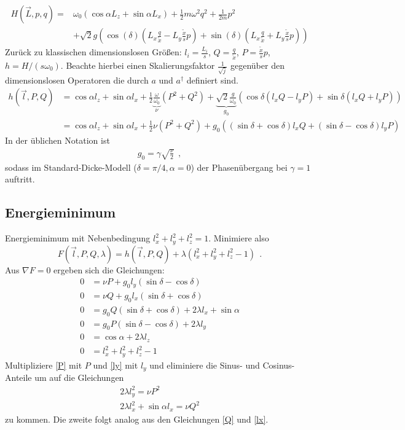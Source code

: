 \begin{align*}
 H(\vec{L},p,q) =& \omega_0 (\cos \alpha L_z + \sin\alpha L_x)+ \frac{1}{2} m \omega^2 q^2 + \frac{1}{2m}p^2 \\
&+ \sqrt{2}g\left( \cos(\delta) ( L_x \frac{q}{\tilde{x}} - L_y \frac{\tilde{x}}{s} p) 
+ \sin(\delta)( L_x \frac{q}{\tilde{x}} + L_y \frac{\tilde{x}}{s} p)\right)
\end{align*}
Zurück zu klassischen dimensionslosen Größen: $l_i = \frac{L_i}{s}$, $Q=\frac{q}{\tilde{x}}$, $P = \frac{\tilde{x}}{s}p$, $h = H/(s\omega_0)$. Beachte hierbei einen Skalierungsfaktor $\frac{1}{\sqrt{j}}$ gegenüber den dimensionslosen Operatoren die durch $a$ und $a^\dagger$ definiert sind.
\begin{align}
 h(\vec{l},P,Q) &= \cos\alpha l_z + \sin \alpha l_x+ \frac{1}{2} \underbrace{\frac{\omega}{\omega_0}}_{\nu} (P^2 + Q^2) 
  + \underbrace{\sqrt{2} \frac{g}{\omega_0}}_{g_0} \left( \cos\delta (l_x Q - l_y P) + \sin\delta (l_x Q+l_y P)\right) \nonumber\\ 
  &= \cos\alpha l_z + \sin \alpha l_x + \frac12 \nu (P^2+Q^2) + g_0\left((\sin\delta + \cos\delta)l_x Q + (\sin\delta -\cos\delta)l_y P \right) \label{Hamiltonian}
\end{align}
In der üblichen Notation ist
\begin{align}
  g_0 = \gamma\sqrt{\frac{\nu}{2}}~~,
\end{align}
sodass im Standard-Dicke-Modell ($\delta = \pi/4,\alpha = 0$) der Phasenübergang bei $\gamma = 1$ auftritt.  
\subsection{Energieminimum}
Energieminimum mit Nebenbedingung $l_x^2 + l_y^2+l_z^2 = 1$. Minimiere also 
\begin{equation*}
F(\vec{l}, P,Q, \lambda) = h(\vec{l}, P,Q)+\lambda (l_x^2 + l_y^2+l_z^2 - 1) ~~.
\end{equation*}
Aus $\nabla F = 0$ ergeben sich die Gleichungen:
\begin{align}
  0 &= \nu P + g_0 l_y (\sin \delta - \cos \delta)\label{P}\\
  0 &= \nu Q + g_0 l_x (\sin \delta + \cos \delta)\label{Q}\\
  0 &= g_0 Q (\sin \delta + \cos\delta) + 2\lambda l_x + \sin\alpha\label{lx}\\
  0 &= g_0 P (\sin \delta - \cos\delta) + 2\lambda l_y\label{ly}\\
  0 &= \cos\alpha + 2\lambda l_z\label{lz}\\
  0 &= l_x^2 + l_y^2 + l_z^2 -1 \label{lambda}
\end{align}
Multipliziere \eqref{P} mit $P$ und \eqref{ly} mit $l_y$ und eliminiere die Sinus- und Cosinus-Anteile um auf die Gleichungen
\begin{align}
 2\lambda l_y^2 = \nu P^2 \label{P^2}\\
2\lambda l_x^2 + \sin\alpha l_x  = \nu Q^2 \label{Q^2}
\end{align}
zu kommen. Die zweite folgt analog aus den Gleichungen \eqref{Q} und \eqref{lx}. \\


